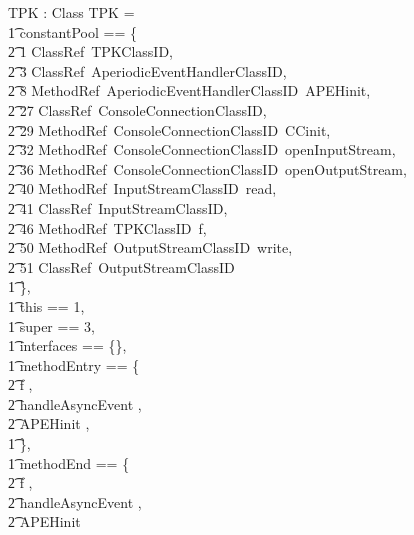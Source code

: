 \begin{figure}[p]
  \scriptsize
  \setlength{\zedindent}{0cm}
  \setlength{\zedtab}{0.3cm}
  \setlength{\zedleftsep}{0.1cm}
  \setlength{\linewidth}{10cm}
  \begin{vwcol}[widths={0.7,0.3},rule=none]
    \begin{axdef}
      TPK : Class
    \where
      TPK = \lblot \\
      \t1 constantPool == \{ \\
      \t2 1 \mapsto ClassRef~TPKClassID, \\
      \t2 3 \mapsto ClassRef~AperiodicEventHandlerClassID, \\
      \t2 8 \mapsto MethodRef~AperiodicEventHandlerClassID~APEHinit, \\
      \t2 27 \mapsto ClassRef~ConsoleConnectionClassID, \\
      \t2 29 \mapsto  MethodRef~ConsoleConnectionClassID~CCinit, \\
      \t2 32 \mapsto MethodRef~ConsoleConnectionClassID~openInputStream, \\
      \t2 36 \mapsto MethodRef~ConsoleConnectionClassID~openOutputStream, \\
      \t2 40 \mapsto MethodRef~InputStreamClassID~read, \\
      \t2 41 \mapsto ClassRef~InputStreamClassID, \\
      \t2 46 \mapsto MethodRef~TPKClassID~f, \\
      \t2 50 \mapsto MethodRef~OutputStreamClassID~write, \\
      \t2 51 \mapsto ClassRef~OutputStreamClassID \\
      \t1 \}, \\
      \t1 this == 1, \\
      \t1 super == 3, \\
      \t1 interfaces == \{\}, \\
      \t1 methodEntry == \{ \\
      \t2 f , \\
      \t2 handleAsyncEvent , \\
      \t2 APEHinit , \\
      \t1 \}, \\
      \t1 methodEnd == \{ \\
      \t2 f , \\
      \t2 handleAsyncEvent , \\
      \t2 APEHinit  \\

\end{axdef}
\end{vwcol}
\end{figure}
